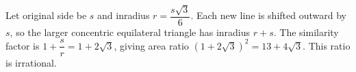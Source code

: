 Let original side be $s$ and inradius $r=\dfrac{s\sqrt3}{6}$. Each new line is shifted outward by $s$, so the larger concentric equilateral triangle has inradius $r+s$. The similarity factor is $1+\dfrac{s}{r}=1+2\sqrt3$, giving area ratio $\boxed{(1+2\sqrt3)^2=13+4\sqrt3}$. This ratio is irrational.
